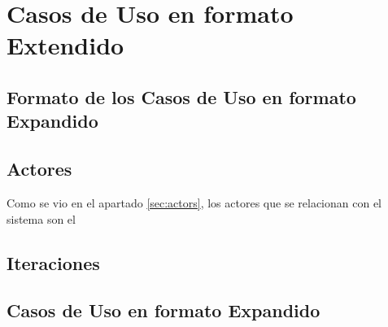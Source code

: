 \chapter{Casos de Uso en formato Extendido}
\section{Formato de los Casos de Uso en formato Expandido}
\section{Actores}
\par Como se vio en el apartado \ref{sec:actors}, los actores que se relacionan con el sistema son el 
\section{Iteraciones}
\section{Casos de Uso en formato Expandido}
